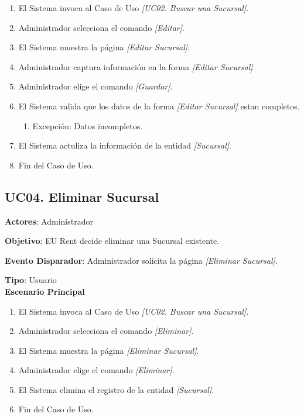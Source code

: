 \documentclass[10pt, letterpaper]{report}
\begin{document}
\begin{enumerate}
\item El Sistema invoca al Caso de Uso \textit{[UC02. Buscar una Sucursal]}.
\item Administrador selecciona el comando \textit{[Editar]}.
\item El Sistema muestra la página \textit{[Editar Sucursal]}.
\item Administrador captura información en la forma \textit{[Editar Sucursal]}.
\item Administrador elige el comando \textit{[Guardar]}.
\item El Sistema valida que los datos de la forma \textit{[Editar Sucursal]} estan completos.
	\begin{enumerate}
		\item Excepción: Datos incompletos.
	\end{enumerate}
\item El Sistema actuliza la información de la entidad \textit{[Sucursal]}.
\item Fin del Caso de Uso.
\end{enumerate}
\subsection{UC04. Eliminar Sucursal} \label{EliminarSucursal}
\textbf{Actores}: Administrador

\textbf{Objetivo}: EU Rent decide eliminar una Sucursal existente.

\textbf{Evento Disparador}: Administrador solicita la página \textit{[Eliminar Sucursal]}.

\textbf{Tipo}: Usuario\\

\textbf{Escenario Principal}

\begin{enumerate}
\item El Sistema invoca al Caso de Uso \textit{[UC02. Buscar una Sucursal]}.
\item Administrador selecciona el comando \textit{[Eliminar]}.
\item El Sistema muestra la página \textit{[Eliminar Sucursal]}.
\item Administrador elige el comando \textit{[Eliminar]}.
\item El Sistema elimina el registro de la entidad \textit{[Sucursal]}.
\item Fin del Caso de Uso.
\end{enumerate}
\end{document}

